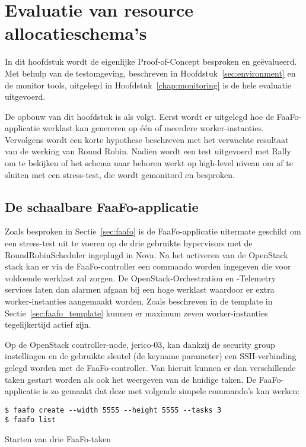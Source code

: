 \chapter{Evaluatie van resource allocatieschema's}
\label{chap:evaluation}

In dit hoofdstuk wordt de eigenlijke Proof-of-Concept besproken en geëvalueerd. Met behulp van de testomgeving, beschreven in Hoofdstuk~\ref{sec:environment} en de monitor tools, uitgelegd in Hoofdstuk~\ref{chap:monitoring} is de hele evaluatie uitgevoerd.

De opbouw van dit hoofdstuk is als volgt. Eerst wordt er uitgelegd hoe de FaaFo-applicatie werklast kan genereren op één of meerdere worker-instanties. Vervolgens wordt een korte hypothese beschreven met het verwachte resultaat van de werking van Round Robin. Nadien wordt een test uitgevoerd met Rally om te bekijken of het schema naar behoren werkt op high-level niveau om af te sluiten met een stress-test, die wordt gemonitord en besproken.

\section{De schaalbare FaaFo-applicatie}
\label{sec:scalable_faafo}

Zoals besproken in Sectie~\ref{sec:faafo} is de FaaFo-applicatie uitermate geschikt om een stress-test uit te voeren op de drie gebruikte hypervisors met de RoundRobinScheduler ingeplugd in Nova. Na het activeren van de OpenStack stack kan er via de FaaFo-controller een commando worden ingegeven die voor voldoende werklast zal zorgen. De OpenStack-Orchestration en -Telemetry services laten dan alarmen afgaan bij een hoge werklast waardoor er extra worker-instanties aangemaakt worden. Zoals beschreven in de template in Sectie~\ref{sec:faafo_template} kunnen er maximum zeven worker-instanties tegelijkertijd actief zijn.

Op de OpenStack controller-node, jerico-03, kan dankzij de security group instellingen en de gebruikte sleutel (de key\textunderscore name parameter) een SSH-verbinding gelegd worden met de FaaFo-controller. Van hieruit kunnen er dan verschillende taken gestart worden als ook het weergeven van de huidige taken. De FaaFo-applicatie is zo gemaakt dat deze met volgende simpele commando's kan werken:

\begin{code}
\begin{verbatim}
$ faafo create --width 5555 --height 5555 --tasks 3
$ faafo list
\end{verbatim}
\caption{Starten van drie FaaFo-taken}
\end{code}

